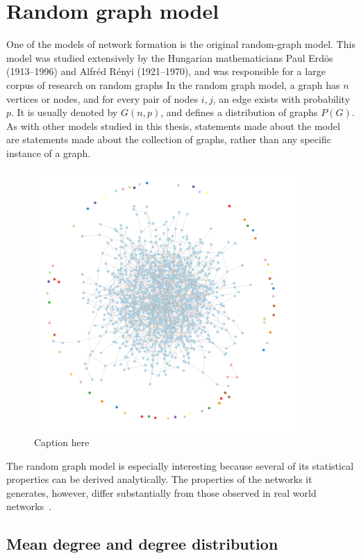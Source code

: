 \section{Random graph model} %
\label{sec:random_graph_model}



One of the models of network formation is the original random-graph model.
This model was studied extensively by the Hungarian mathematicians Paul Erd\"os (1913–1996) and Alfr\'ed R\'enyi (1921–1970), and was responsible for a large corpus of research on random graphs
In the random graph model, a graph has $n$ vertices or nodes, and for every pair of nodes $i, j$, an edge exists with probability $p$.
It is usually denoted by $G(n, p)$, and defines a distribution of graphs $P(G)$.
As with other models studied in this thesis, statements made about the model are statements made about the collection of graphs, rather than any specific instance of a graph.

\begin{figure}[tb]
	\centering
	\includegraphics[width=10cm]{figures/gnp_hairball.png}
	\caption{Caption here}
	\label{fig:figure1}
\end{figure}

The random graph model is especially interesting because several of its statistical properties can be derived analytically.
The properties of the networks it generates, however, differ substantially from those observed in real world networks~\cite{Albert:2002p4071}.


\subsection{Mean degree and degree distribution} %
\label{ssub:mean_degree_and_degree_distribution}


